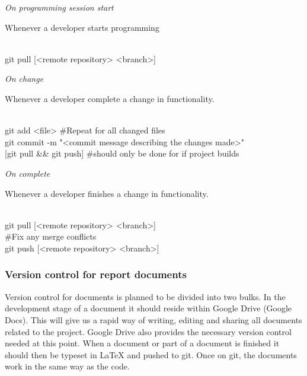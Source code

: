 \textit{On programming session start}
\begin{description}
	{\indentitem \item[Description:] Whenever a developer starts programming}
	{\indentitem \item[Command:] \hfill \\
		\hspace*{3em} git pull [<remote repository> <branch>]}
\end{description}

\textit{On change}
\begin{description}
	{\indentitem \item[Description:] Whenever a developer complete a change in functionality.}
	{\indentitem \item[Command:] \hfill \\
	\hspace*{3em} git add <file> \#Repeat for all changed files \\
	\hspace*{3em} git commit -m "<commit message describing the changes made>"\\
	\hspace*{3em} [git pull \&\& git push] \#should only be done for if project builds}
\end{description}

\textit{On complete}
\begin{description}
{\indentitem \item[Description:]  Whenever a developer finishes a change in functionality.}
{\indentitem \item[Command:] \hfill \\
\hspace*{3em} git pull [<remote repository> <branch>] \\ 
\hspace*{3em} \#Fix any merge conflicts \\
\hspace*{3em} git push [<remote repository> <branch>] }
\end{description}

\subsubsection{Version control for report documents}
Version control for documents is planned to be divided into two bulks. In the development stage of a document it should reside within Google Drive (Google Docs). This will give us a rapid way of writing, editing and sharing all documents related to the project. Google Drive also provides the necessary version control needed at this point. When a document or part of a document is finished it should then be typeset in LaTeX and pushed to \gls{git}. Once on \gls{git}, the documents work in the same way as the code.  


